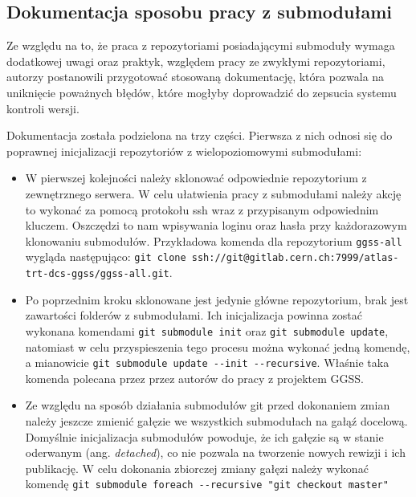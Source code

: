 \subsection{Dokumentacja sposobu pracy z submodułami}
Ze względu na to, że praca z repozytoriami posiadającymi submoduły wymaga dodatkowej uwagi oraz praktyk, względem pracy ze zwykłymi repozytoriami, autorzy postanowili przygotować stosowaną dokumentację, która pozwala na uniknięcie poważnych błędów, które mogłyby doprowadzić do zepsucia systemu kontroli wersji.

Dokumentacja została podzielona na trzy części. Pierwsza z nich odnosi się do poprawnej inicjalizacji repozytoriów z wielopoziomowymi submodułami:
\begin{itemize}
    \item W pierwszej kolejności należy sklonować odpowiednie repozytorium z zewnętrznego serwera. W celu ułatwienia pracy z submodułami należy akcję to wykonać za pomocą protokołu ssh wraz z przypisanym odpowiednim kluczem. Oszczędzi to nam wpisywania loginu oraz hasła przy każdorazowym klonowaniu submodułów. Przykładowa komenda dla repozytorium \lstinline{ggss-all} wygląda następująco: \lstinline{git clone ssh://git@gitlab.cern.ch:7999/atlas-trt-dcs-ggss/ggss-all.git}.
    \item Po poprzednim kroku sklonowane jest jedynie główne repozytorium, brak jest zawartości folderów z submodułami. Ich inicjalizacja powinna zostać wykonana komendami \lstinline{git submodule init} oraz \lstinline{git submodule update}, natomiast w celu przyspieszenia tego procesu można wykonać jedną komendę, a mianowicie \lstinline{git submodule update --init --recursive}. Właśnie taka komenda polecana przez przez autorów do pracy z projektem GGSS.
    \item Ze względu na sposób działania submodułów git przed dokonaniem zmian należy jeszcze zmienić gałęzie we wszystkich submodułach na gałąź docelową. Domyślnie inicjalizacja submodułów powoduje, że ich gałęzie są w stanie oderwanym (ang. \emph{detached}), co nie pozwala na tworzenie nowych rewizji i ich publikację. W celu dokonania zbiorczej zmiany gałęzi należy wykonać komendę \lstinline{git submodule foreach --recursive "git checkout master"}
\end{itemize}

